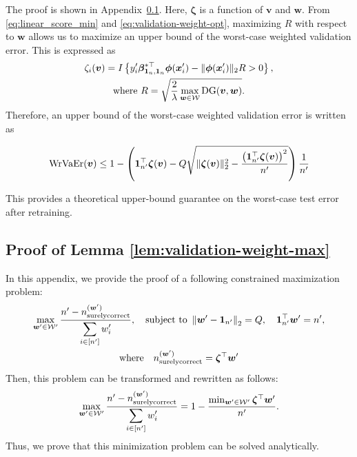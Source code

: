 	The proof is shown in Appendix~\ref{app:validation-weight-max}.
	Here, $\bm \zeta$ is a function of $\bm v$ and $\bm w$.
	From \eqref{eq:linear_score_min} and \eqref{eq:validation-weight-opt}, maximizing $R$ with respect to $\bm w$ allows us to maximize an upper bound of the worst-case weighted validation error. This is expressed as
	\begin{gather}
		\zeta_i(\bm v)
		=
		I\left\{
		y_i^\prime \bm \beta_{\bm 1_n, \bm 1_n}^{*\top} \bm \phi(\bm x_i^\prime) - \|\bm \phi(\bm x_i^\prime)\|_2 R > 0
		\right\}, \\
		\text{where } R = \sqrt{\frac{2}{\lambda} \max_{\bm w \in {\mathcal W}} {\rm DG}(\bm v, \bm w)}.
	 \end{gather}
	Therefore, an upper bound of the worst-case weighted validation error is written as

	\begin{align}
		{\rm WrVaEr}(\bm v)
		\le
		1
		-
		\left(
		\bm 1_{n^\prime}^\top \bm \zeta(\bm v)
		-
		Q
		\sqrt{
		\|\bm \zeta(\bm v)\|_2^2
		-
		\frac{
		\left(\bm 1_{n^\prime}^\top \bm \zeta(\bm v)\right)^2
		}{
		n^\prime
		}
		}
		\right)
		\frac{1}{n^\prime}
		\end{align}

	This provides a theoretical upper-bound guarantee on the worst-case test error after retraining.



\subsection{Proof of Lemma \ref{lem:validation-weight-max}} \label{app:validation-weight-max}

In this appendix, we provide the proof of a following constrained maximization problem:
\begin{gather}
	\displaystyle \max_{\bm w' \in \cal W'} \frac{n^\prime - {n_{\rm surelycorrect}^{(\bm w')}}}{\displaystyle \sum_{i \in\left[n^ \prime \right]} w_i'}, \quad \text{subject to } \left\|\bm w'- \bm 1_{n ^\prime} \right\|_2 = Q, \quad \bm 1_{n ^\prime}^\top \bm w' = n ^\prime, \\
	\text{where} \quad n_{\rm surelycorrect}^{(\bm w')} = \bm \zeta^\top \bm w'
\end{gather}
Then, this problem can be transformed and rewritten as follows:
\begin{align}
	\label{eq:linear-score-sum}
	\displaystyle \max_{\bm w' \in \cal W'} \frac{n^\prime - {n_{\rm surelycorrect}^{(\bm w')}}}{\displaystyle \sum_{i \in\left[n^ \prime \right]} w_i'}
	= 1 - \frac{\min_{\bm w' \in {\cal W'}} \bm \zeta^\top \bm w'}{n ^\prime}.
\end{align}
Thus, we prove that this minimization problem can be solved analytically.

